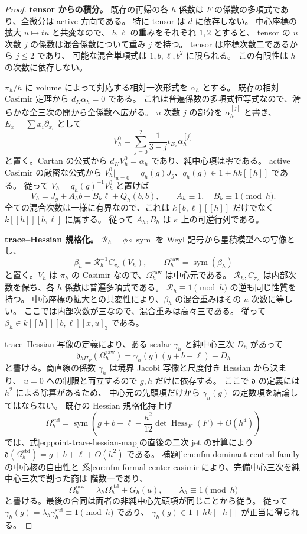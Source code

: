 \begin{proof}
\textbf{tensor からの積分。}
既存の再帰の各 $h$ 係数は $F$ の係数の多項式であり、全微分は active 方向である。
特に tensor は $d$ に依存しない。
中心座標の拡大 $u\mapsto tu$ と共変なので、
$b,\ell$ の重みをそれぞれ $1,2$ とすると、
tensor の $u$ 次数 $j$ の係数は混合係数について重み $j$ を持つ。
tensor は座標次数二であるから $j\le2$ であり、
可能な混合単項式は $1,b,\ell,b^2$ に限られる。
この有限性は $h$ の次数に依存しない。

$\pi_h/h$ に volume によって対応する相対一次形式を $\alpha_h$ とする。
既存の相対 Casimir 定理から $d_K\alpha_h=0$ である。
これは普遍係数の多項式恒等式なので、滑らかな全三次の開から全係数へ広がる。
$u$ 次数 $j$ の部分を $\alpha_h^{[j]}$ と書き、
$E_x=\sum x_i\partial_{x_i}$ として
\[
 V_h^0=\sum_{j=0}^2\frac1{3-j}\iota_{E_x}\alpha_h^{[j]}
\]
と置く。Cartan の公式から $d_KV_h^0=\alpha_h$ であり、純中心項は零である。
active Casimir の厳密な公式から
$V_h^0|_{u=0}=q_h(g)J_g$、$q_h(g)\in1+h k[[h]]$ である。
従って $V_h=q_h(g)^{-1}V_h^0$ と置けば
\[
 V_h=J_g+A_hb+B_h\ell+Q_h(b,b),\qquad
 A_h\equiv1,\quad B_h\equiv1\pmod h.
\]
全ての混合次数は一様に有界なので、これは
$k[b,\ell][[h]]$ だけでなく $k[[h]][b,\ell]$ に属する。
従って $A_h,B_h$ は $\kappa$ 上の可逆行列である。

\textbf{trace--Hessian 規格化。}
$\mathcal R_h=\phi\circ\operatorname{sym}$ を Weyl 記号から星積模型への写像とし、
\[
 \beta_h=\mathcal R_h^{-1}C_{\pi_h}(V_h),\qquad
 \Omega_h^{\mathrm{raw}}=\operatorname{sym}(\beta_h)
\]
と置く。$V_h$ は $\pi_h$ の Casimir なので、$\Omega_h^{\mathrm{raw}}$ は中心元である。
$\mathcal R_h,C_{\pi_h}$ は内部次数を保ち、各 $h$ 係数は普遍多項式である。
$\mathcal R_h\equiv1\pmod h$ の逆も同じ性質を持つ。
中心座標の拡大との共変性により、$\beta_h$ の混合重みはその $u$ 次数に等しい。
ここでは内部次数が三なので、混合重みは高々三である。
従って $\beta_h\in k[[h]][b,\ell][x,u]_3$ である。

trace--Hessian 写像の定義により、ある scalar $\gamma_h$ と純中心三次 $D_h$ があって
\[
 \mathfrak d_{h\Pi_F}(\Omega_h^{\mathrm{raw}})
   =\gamma_h(g)(g+b+\ell)+D_h
\]
と書ける。商直線の係数 $\gamma_h$ は境界 Jacobi 写像と尺度付き Hessian から決まり、
$u=0$ への制限と両立するので $g,h$ だけに依存する。
ここで $\mathfrak d$ の定義には $h^2$ による除算があるため、
中心元の先頭項だけから $\gamma_h(g)$ の定数項を結論してはならない。
既存の Hessian 規格化持上げ
\[
 \Omega_h^{\mathrm{std}}
 =\operatorname{sym}\left(g+b+\ell
            -\frac{h^2}{12}\det\operatorname{Hess}_K(F)+O(h^4)\right)
\]
では、式\eqref{eq:point-trace-hessian-map}の直後の二次 jet の計算により
$\mathfrak d(\Omega_h^{\mathrm{std}})=g+b+\ell+O(h^2)$ である。
補題\ref{lem:nfm-dominant-central-family}の中心核の自由性と
系\ref{cor:nfm-formal-center-casimir}により、完備中心三次を純中心三次で割った商は
階数一であり、
\[
 \Omega_h^{\mathrm{raw}}=\lambda_h\Omega_h^{\mathrm{std}}+G_h(u),
 \qquad \lambda_h\equiv1\pmod h
\]
と書ける。最後の合同は両者の非純中心先頭項が同じことから従う。
従って $\gamma_h(g)=\lambda_h \gamma_h^{\mathrm{std}}\equiv1\pmod h$ であり、
$\gamma_h(g)\in1+h k[[h]]$ が正当に得られる。


\end{proof}
